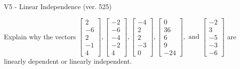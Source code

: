 \begin{exercise}
  \begin{exerciseTitle}V5 - Linear Independence (ver. 525)\end{exerciseTitle}
  \begin{exerciseStatement}
    Explain why the vectors \(\left[\begin{array}{r}
2 \\
-6 \\
2 \\
-1 \\
4
\end{array}\right] , \left[\begin{array}{r}
-2 \\
-6 \\
-4 \\
-2 \\
4
\end{array}\right] , \left[\begin{array}{r}
-4 \\
2 \\
2 \\
-3 \\
0
\end{array}\right] , \left[\begin{array}{r}
0 \\
36 \\
6 \\
9 \\
-24
\end{array}\right] , \text{ and } \left[\begin{array}{r}
-2 \\
3 \\
-5 \\
-3 \\
-6
\end{array}\right]\) are linearly dependent or linearly independent.	



\end{exerciseStatement}
\end{exercise}
